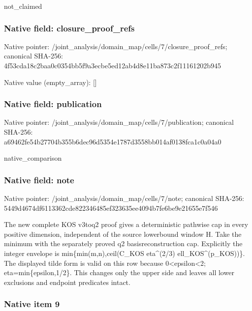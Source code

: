 \documentclass[10pt,a4paper]{article}
\begin{document}
not\_claimed


\subsubsection{Native field: closure\_proof\_refs}


Native pointer: /joint\_analysis/domain\_m\allowbreak{}ap/cells/7/closure\_proof\allowbreak{}\_refs; canonical SHA-256: 4f53cda18c2baa0c0354bb5f\allowbreak{}9a3ecbe5ed12ab4d8e11ba87\allowbreak{}3c2f11161202b945



Native value (empty\_array): []



\subsubsection{Native field: publication}


Native pointer: /joint\_analysis/domain\_m\allowbreak{}ap/cells/7/publication; canonical SHA-256: a69462fe54b27704b355b6de\allowbreak{}c96d5354e1787d3558bb014a\allowbreak{}f0138fca1c0a04a0


native\_comparison


\subsubsection{Native field: note}


Native pointer: /joint\_analysis/domain\_map/cells/7/note; canonical SHA-256: 5449d4674df6113362cde822\allowbreak{}346485ef323635ee4094b7fe\allowbreak{}6be9e21655e7f546


The new complete KOS v3toq2 proof gives a deterministic pathwise cap in every positive dimension, independent of the source lowerbound window H. Take the minimum with the separately proved q2 basisreconstruction cap. Explicitly the integer envelope is min\{min(m,n),ceil(C\_KOS eta\textasciicircum{}(2/3) ell\_KOS\textasciicircum{}(p\_KOS))\}. The displayed tilde form is valid on this row because 0<epsilon<2; eta=min\{epsilon,1/2\}. This changes only the upper side and leaves all lower exclusions and endpoint predicates intact.


\subsubsection{Native item 9}
\end{document}

